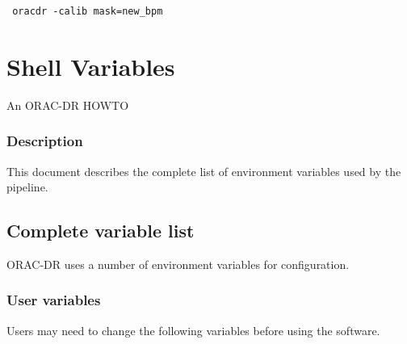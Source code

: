 \documentclass[twoside,11pt]{article}
\renewcommand{\_}{\texttt{\symbol{95}}}
\begin{document}
\begin{verbatim}
 oracdr -calib mask=new_bpm
\end{verbatim}

\section{Shell Variables\label{Shell_Variables}}


An ORAC-DR HOWTO

\subsubsection*{Description\label{Shell_Variables_Description}}


This document describes the complete list of environment variables
used by the pipeline.

\subsection*{Complete variable list\label{Shell_Variables_Complete_variable_list}}


ORAC-DR uses a number of environment variables for configuration.

\subsubsection*{User variables\label{Shell_Variables_User_variables}}


Users may need to change the following variables before using the
software.
\end{document}
